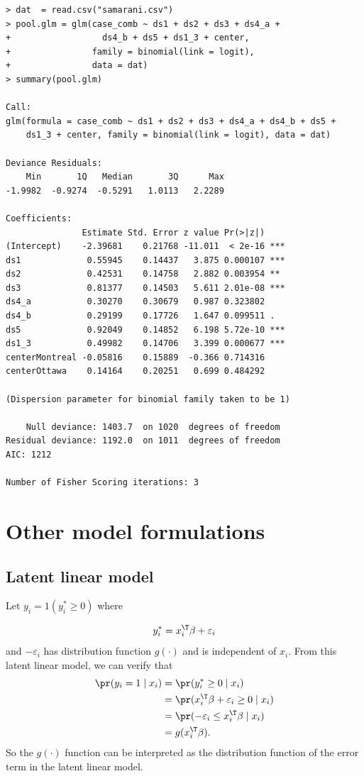 \begin{lstlisting}
> dat  = read.csv("samarani.csv")
> pool.glm = glm(case_comb ~ ds1 + ds2 + ds3 + ds4_a + 
+                  ds4_b + ds5 + ds1_3 + center,
+                family = binomial(link = logit),
+                data = dat)
> summary(pool.glm)

Call:
glm(formula = case_comb ~ ds1 + ds2 + ds3 + ds4_a + ds4_b + ds5 + 
    ds1_3 + center, family = binomial(link = logit), data = dat)

Deviance Residuals: 
    Min       1Q   Median       3Q      Max  
-1.9982  -0.9274  -0.5291   1.0113   2.2289  

Coefficients:
               Estimate Std. Error z value Pr(>|z|)    
(Intercept)    -2.39681    0.21768 -11.011  < 2e-16 ***
ds1             0.55945    0.14437   3.875 0.000107 ***
ds2             0.42531    0.14758   2.882 0.003954 ** 
ds3             0.81377    0.14503   5.611 2.01e-08 ***
ds4_a           0.30270    0.30679   0.987 0.323802    
ds4_b           0.29199    0.17726   1.647 0.099511 .  
ds5             0.92049    0.14852   6.198 5.72e-10 ***
ds1_3           0.49982    0.14706   3.399 0.000677 ***
centerMontreal -0.05816    0.15889  -0.366 0.714316    
centerOttawa    0.14164    0.20251   0.699 0.484292    

(Dispersion parameter for binomial family taken to be 1)

    Null deviance: 1403.7  on 1020  degrees of freedom
Residual deviance: 1192.0  on 1011  degrees of freedom
AIC: 1212

Number of Fisher Scoring iterations: 3
\end{lstlisting}

 

\section{Other model formulations}

\subsection{Latent linear model}\label{sec::binary-reg-latent}

Let $y_{i}=1(y_{i}^{*}\geq0)$ where

\[
y_{i}^{*}=x_{i}^{\T}\beta + \varepsilon_{i}
\]
and $ - \varepsilon_{i}$ has distribution function $g(\cdot)$ and is
independent of $x_{i}$. From this latent linear model, we can verify
that 
\begin{align*}
\pr(y_{i}  =1\mid x_{i}) &=\pr(y_{i}^{*}\geq0\mid x_{i})\\
 & =\pr(x_{i}^{\T}\beta + \varepsilon_{i}\geq0\mid x_{i})\\
 & =\pr( - \varepsilon_{i}\leq x_{i}^{\T}\beta\mid x_{i})\\
 & =g(x_{i}^{\T}\beta).
\end{align*}
So the $g(\cdot)$ function can be interpreted as the distribution
function of the error term in the latent linear model. 


